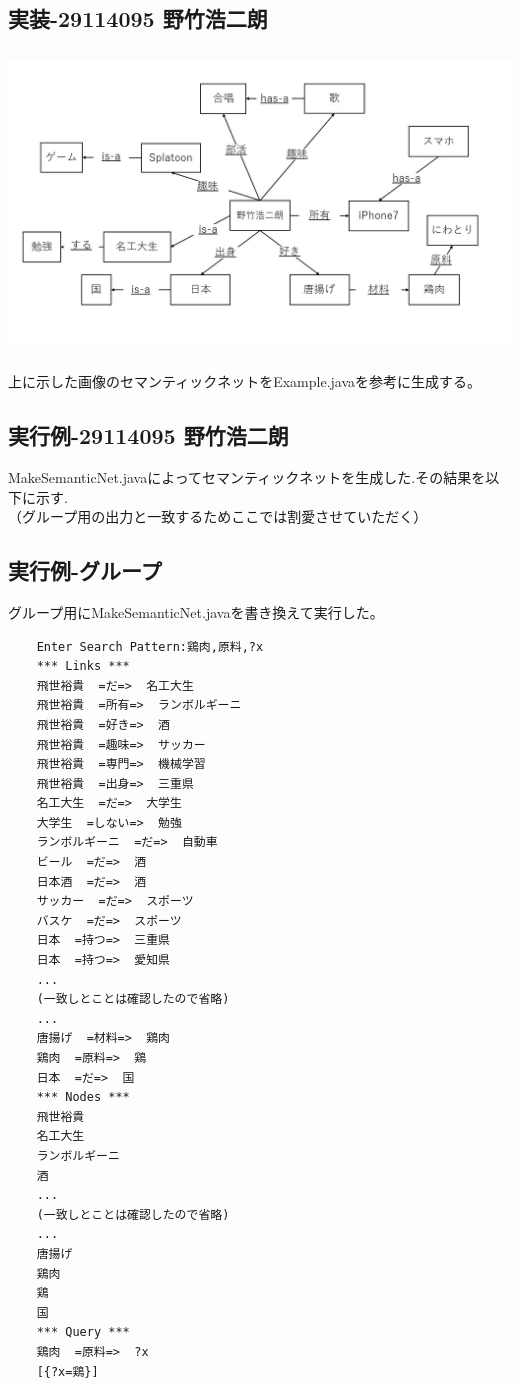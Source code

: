 \documentclass{jarticle}
\begin{document}
\subsection{実装-29114095 野竹浩二朗}
\includegraphics[width=150mm,height=80mm]{095/Semantic-Kojiro.jpg}

上に示した画像のセマンティックネットをExample.javaを参考に生成する。

\subsection{実行例-29114095 野竹浩二朗}
MakeSemanticNet.javaによってセマンティックネットを生成した.その結果を以下に示す.\\
（グループ用の出力と一致するためここでは割愛させていただく）

\subsection{実行例-グループ}
グループ用にMakeSemanticNet.javaを書き換えて実行した。
\begin{lstlisting}
    Enter Search Pattern:鶏肉,原料,?x
    *** Links ***
    飛世裕貴  =だ=>  名工大生
    飛世裕貴  =所有=>  ランボルギーニ
    飛世裕貴  =好き=>  酒
    飛世裕貴  =趣味=>  サッカー
    飛世裕貴  =専門=>  機械学習
    飛世裕貴  =出身=>  三重県
    名工大生  =だ=>  大学生
    大学生  =しない=>  勉強
    ランボルギーニ  =だ=>  自動車
    ビール  =だ=>  酒
    日本酒  =だ=>  酒
    サッカー  =だ=>  スポーツ
    バスケ  =だ=>  スポーツ
    日本  =持つ=>  三重県
    日本  =持つ=>  愛知県
    ...
    (一致しとことは確認したので省略)
    ...
    唐揚げ  =材料=>  鶏肉
    鶏肉  =原料=>  鶏
    日本  =だ=>  国
    *** Nodes ***
    飛世裕貴
    名工大生
    ランボルギーニ
    酒
    ...
    (一致しとことは確認したので省略)
    ...
    唐揚げ
    鶏肉
    鶏
    国
    *** Query ***
    鶏肉  =原料=>  ?x
    [{?x=鶏}]
\end{lstlisting}
\end{document}
